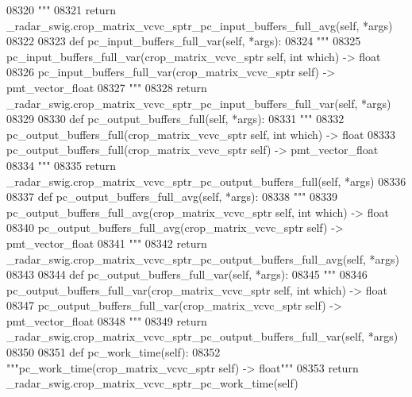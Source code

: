 \begin{DoxyCode}
{{{{{{{{{{{{{{{{{{{{{{{{{{{08320 \textcolor{stringliteral}{        """}
08321         \textcolor{keywordflow}{return} \_radar\_swig.crop\_matrix\_vcvc\_sptr\_pc\_input\_buffers\_full\_avg(self, *args)
08322 
08323     \textcolor{keyword}{def }pc_input_buffers_full_var(self, *args):
08324         \textcolor{stringliteral}{"""}
08325 \textcolor{stringliteral}{        pc\_input\_buffers\_full\_var(crop\_matrix\_vcvc\_sptr self, int which) -> float}
08326 \textcolor{stringliteral}{        pc\_input\_buffers\_full\_var(crop\_matrix\_vcvc\_sptr self) -> pmt\_vector\_float}
08327 \textcolor{stringliteral}{        """}
08328         \textcolor{keywordflow}{return} \_radar\_swig.crop\_matrix\_vcvc\_sptr\_pc\_input\_buffers\_full\_var(self, *args)
08329 
08330     \textcolor{keyword}{def }pc_output_buffers_full(self, *args):
08331         \textcolor{stringliteral}{"""}
08332 \textcolor{stringliteral}{        pc\_output\_buffers\_full(crop\_matrix\_vcvc\_sptr self, int which) -> float}
08333 \textcolor{stringliteral}{        pc\_output\_buffers\_full(crop\_matrix\_vcvc\_sptr self) -> pmt\_vector\_float}
08334 \textcolor{stringliteral}{        """}
08335         \textcolor{keywordflow}{return} \_radar\_swig.crop\_matrix\_vcvc\_sptr\_pc\_output\_buffers\_full(self, *args)
08336 
08337     \textcolor{keyword}{def }pc_output_buffers_full_avg(self, *args):
08338         \textcolor{stringliteral}{"""}
08339 \textcolor{stringliteral}{        pc\_output\_buffers\_full\_avg(crop\_matrix\_vcvc\_sptr self, int which) -> float}
08340 \textcolor{stringliteral}{        pc\_output\_buffers\_full\_avg(crop\_matrix\_vcvc\_sptr self) -> pmt\_vector\_float}
08341 \textcolor{stringliteral}{        """}
08342         \textcolor{keywordflow}{return} \_radar\_swig.crop\_matrix\_vcvc\_sptr\_pc\_output\_buffers\_full\_avg(self, *args)
08343 
08344     \textcolor{keyword}{def }pc_output_buffers_full_var(self, *args):
08345         \textcolor{stringliteral}{"""}
08346 \textcolor{stringliteral}{        pc\_output\_buffers\_full\_var(crop\_matrix\_vcvc\_sptr self, int which) -> float}
08347 \textcolor{stringliteral}{        pc\_output\_buffers\_full\_var(crop\_matrix\_vcvc\_sptr self) -> pmt\_vector\_float}
08348 \textcolor{stringliteral}{        """}
08349         \textcolor{keywordflow}{return} \_radar\_swig.crop\_matrix\_vcvc\_sptr\_pc\_output\_buffers\_full\_var(self, *args)
08350 
08351     \textcolor{keyword}{def }pc_work_time(self):
08352         \textcolor{stringliteral}{"""pc\_work\_time(crop\_matrix\_vcvc\_sptr self) -> float"""}
08353         \textcolor{keywordflow}{return} \_radar\_swig.crop\_matrix\_vcvc\_sptr\_pc\_work\_time(self)
}}}}}}}}}}}}}}}}}}}}}}}}}}}
\end{DoxyCode}
